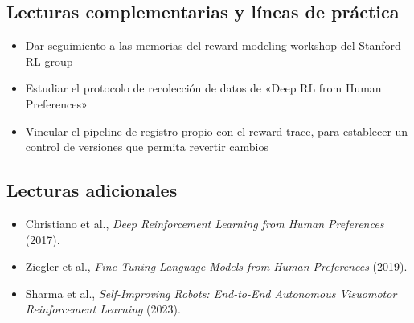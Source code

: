 \subsection{Lecturas complementarias y líneas de práctica}

\begin{itemize}
    \item Dar seguimiento a las memorias del reward modeling workshop del Stanford RL group
    \item Estudiar el protocolo de recolección de datos de «Deep RL from Human Preferences»
    \item Vincular el pipeline de registro propio con el reward trace, para establecer un control de versiones que permita revertir cambios
\end{itemize}

\subsection{Lecturas adicionales}
\begin{itemize}
    \item Christiano et al., \textit{Deep Reinforcement Learning from Human Preferences} (2017).
    \item Ziegler et al., \textit{Fine-Tuning Language Models from Human Preferences} (2019).
    \item Sharma et al., \textit{Self-Improving Robots: End-to-End Autonomous Visuomotor Reinforcement Learning} (2023).
\end{itemize}


